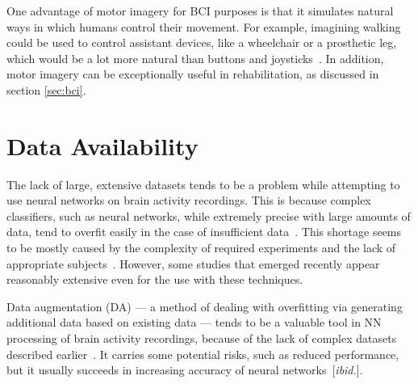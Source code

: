 \documentclass[english, he, bc, kiv, iso690alph]{fasthesis}
\begin{document}

One advantage of motor imagery for BCI purposes is that it simulates natural ways in which humans control their movement. For example, imagining walking could be used to control assistant devices, like a wheelchair or a prosthetic leg, which would be a lot more natural than buttons and joysticks~\cite{he:bci:legs:18}. In addition, motor imagery can be exceptionally useful in rehabilitation, as discussed in section \ref{sec:bci}.

\section{Data Availability}

The lack of large, extensive datasets tends to be a problem while attempting to use neural networks on brain activity recordings. This is because complex classifiers, such as neural networks, while extremely precise with large amounts of data, tend to overfit easily in the case of insufficient data~\cite{domingos:ml:12}. This shortage seems to be mostly caused by the complexity of required experiments and the lack of appropriate subjects~\cite{he:da:21}. However, some studies that emerged recently appear reasonably extensive even for the use with these techniques.

Data augmentation (DA) --- a method of dealing with overfitting via generating additional data based on existing data --- tends to be a valuable tool in NN processing of brain activity recordings, because of the lack of complex datasets described earlier~\cite{he:da:21}. It carries some potential risks, such as reduced performance, but it usually succeeds in increasing accuracy of neural networks~[\emph{ibid.}].
\end{document}
